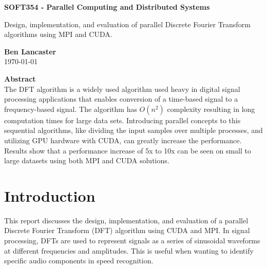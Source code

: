 \documentclass[11pt,a4paper]{article}
\begin{document}
\begin{titlepage}
\begin{center}

\vspace*{3cm}
\Large
\textbf{SOFT354 - Parallel Computing and Distributed Systems}

\vspace{0.4cm}
\large
Design, implementation, and evaluation of parallel Discrete Fourier Transform algorithms using MPI and CUDA.

\vspace{4cm}
\textbf{Ben Lancaster}\\
\today

\vspace{4cm}
\textbf{Abstract}\\
\small
The DFT algorithm is a widely used algorithm used heavy in digital signal processing applications that enables conversion of a time-based signal to a frequency-based signal. The algorithm has $O(n^2)$ complexity resulting in long computation times for large data sets. Introducing parallel concepts to this sequential algorithms, like dividing the input samples over multiple processes, and utilizing GPU hardware with CUDA, can greatly increase the performance. Results show that a performance increase of 5x to 10x can be seen on small to large datasets using both MPI and CUDA solutions. 


\end{center}

\end{titlepage}

\renewcommand*\contentsname{Table of Contents}
\tableofcontents
\newpage

\section{Introduction}
This report discusses the design, implementation, and evaluation of a parallel Discrete Fourier Transform (DFT) algorithm using CUDA and MPI.
In signal processing, DFTs are used to represent signals as a series of sinusoidal waveforms at different frequencies and amplitudes. This is useful when wanting to identify specific audio components in speed recognition. 
\end{document}
